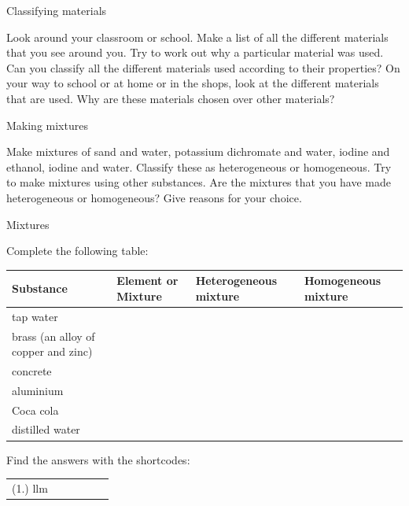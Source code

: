   \label{m38708*eip-478}\begin{activity}{Classifying materials}
{Look around your classroom or school. Make a list of all the different materials that you see around you. Try to work out why a particular material was used. Can you classify all the different materials used according to their properties? On your way to school or at home or in the shops, look at the different materials that are used. Why are these materials chosen over other materials?\par \label{m38708*eip-894}}
\end{activity}
\begin{activity}{Making mixtures}
{Make mixtures of sand and water, potassium dichromate and water, iodine and ethanol, iodine and water. Classify these as heterogeneous or homogeneous. Try to make mixtures using other substances. Are the mixtures that you have made heterogeneous or homogeneous? Give reasons for your choice. \par}
\end{activity}
\label{m38708*secfhsst!!!underscore!!!id169}
\begin{exercises}{Mixtures}
{Complete the following table: \par
\begin{tabular}{|l|l|l|l|}\hline
\textbf{Substance} & \textbf{Element or Mixture} & \textbf{Heterogeneous mixture} & \textbf{Homogeneous mixture} \\ \hline
tap water & & & \\ \hline
brass (an alloy of copper and zinc) & & & \\ \hline
concrete & & & \\ \hline
aluminium & & & \\ \hline
Coca cola & & & \\ \hline
distilled water & & & \\ \hline
\end{tabular}
    \label{m38708*cid3}
\par {} Find the answers with the shortcodes:
 \par \begin{tabular}[h]{cccccc}
 (1.) llm  & \end{tabular} }
\end{exercises}
